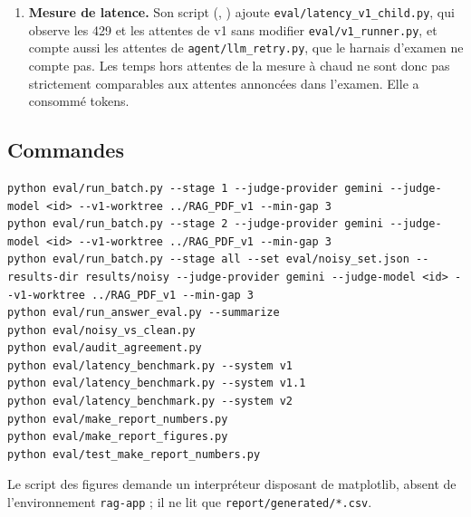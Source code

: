 \begin{enumerate}
        accord de \EvAuditAiCorrectAgree~\% sur le correct et \EvAuditAiHallucAgree~\% sur l'hallucination, $n=\EvAuditAiN$. Ce n'est pas l'audit pré-enregistré et ces valeurs n'y sont pas comptées.
        Le dépôt n'indique pas si le relecteur humain a vu ces étiquettes.
  \item \textbf{Mesure de latence.} Son script (\EvCommitLatencyScript, \EvDateLatencyScript) ajoute \texttt{eval/latency\_v1\_child.py}, qui observe les 429 et les attentes de v1 sans modifier
        \texttt{eval/v1\_runner.py}, et compte aussi les attentes de \texttt{agent/llm\_retry.py}, que le harnais d'examen ne compte pas. Les temps hors attentes de la mesure à chaud ne sont donc pas
        strictement comparables aux attentes annoncées dans l'examen. Elle a consommé \EvLatTokensTotal{} tokens.
\end{enumerate}




\subsection{Commandes}
\begin{lstlisting}
python eval/run_batch.py --stage 1 --judge-provider gemini --judge-model <id> --v1-worktree ../RAG_PDF_v1 --min-gap 3
python eval/run_batch.py --stage 2 --judge-provider gemini --judge-model <id> --v1-worktree ../RAG_PDF_v1 --min-gap 3
python eval/run_batch.py --stage all --set eval/noisy_set.json --results-dir results/noisy --judge-provider gemini --judge-model <id> --v1-worktree ../RAG_PDF_v1 --min-gap 3
python eval/run_answer_eval.py --summarize
python eval/noisy_vs_clean.py
python eval/audit_agreement.py
python eval/latency_benchmark.py --system v1
python eval/latency_benchmark.py --system v1.1
python eval/latency_benchmark.py --system v2
python eval/make_report_numbers.py
python eval/make_report_figures.py
python eval/test_make_report_numbers.py
\end{lstlisting}
Le script des figures demande un interpréteur disposant de matplotlib, absent de l'environnement \texttt{rag-app} ; il ne lit que
\texttt{report/generated/*.csv}.
